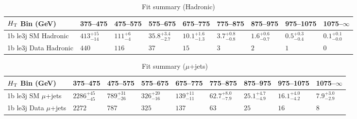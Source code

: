 \documentclass[8pt]{article}
\def\scalht{\mbox{$H_{\rm{T}}$}\xspace}
\newcommand\T{\rule{0pt}{2.6ex}}
\begin{document}
\begin{table}[ht!]
\caption{Fit summary (Hadronic)}
\label{tab:ensemble-summary}
\centering
\begin{tabular}{ lllllllll }

\hline
\scalht Bin (GeV)       & 375--475                       & 475--575                       & 575--675                       & 675--775                       & 775--875                       & 875--975                       & 975--1075                      & 1075--$\infty$                 \\ [1.000000ex]
\hline
1b le3j SM Hadronic\T   & $413^{+15}_{-14}$              & $111^{+6}_{-4}$                & $35.8^{+3.4}_{-2.7}$           & $10.1^{+1.6}_{-1.3}$           & $3.7^{+0.8}_{-0.8}$            & $1.6^{+0.6}_{-0.7}$            & $0.5^{+0.3}_{-0.4}$            & $0.1^{+0.1}_{-0.0}$            \\ 
1b le3j Data Hadronic\T & $440$                          & $116$                          & $37$                           & $15$                           & $3$                            & $2$                            & $1$                            & $0$                            \\ 
\hline

\end{tabular}
\end{table}
\begin{table}[ht!]
\caption{Fit summary ($\mu$+jets)}
\label{tab:ensemble-summary}
\centering
\begin{tabular}{ lllllllll }

\hline
\scalht Bin (GeV)       & 375--475                       & 475--575                       & 575--675                       & 675--775                       & 775--875                       & 875--975                       & 975--1075                      & 1075--$\infty$                 \\ [1.000000ex]
\hline
1b le3j SM $\mu$+jets\T & $2286^{+45}_{-45}$             & $789^{+31}_{-26}$              & $326^{+20}_{-16}$              & $139^{+11}_{-11}$              & $62.7^{+8.0}_{-7.9}$           & $25.1^{+4.7}_{-4.9}$           & $16.1^{+4.0}_{-4.2}$           & $7.9^{+3.0}_{-2.9}$            \\ 
1b le3j Data $\mu$+jets\T & $2272$                         & $787$                          & $325$                          & $137$                          & $63$                           & $25$                           & $16$                           & $8$                            \\ 
\hline

\end{tabular}
\end{table}
\end{document}
